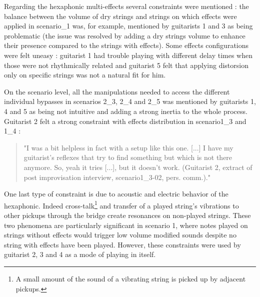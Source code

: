 \documentclass{article}
\begin{document}
Regarding the hexaphonic multi-effects several constraints were mentioned : the balance between the volume of dry strings and strings on which effects were applied in scenario\_1 was, for example, mentioned by guitarists 1 and 3 as being problematic (the issue was resolved by adding a dry strings volume to enhance their presence compared to the strings with effects). Some effects configurations were felt uneasy : guitarist 1 had trouble playing with different delay times when those were not rhythmically related and guitarist 5 felt that applying distorsion only on specific strings was not a natural fit for him. 

On the scenario level, all the manipulations needed to access the different individual bypasses in scenarios 2\_3, 2\_4 and 2\_5 was mentioned by guitarists 1, 4 and 5 as being not intuitive and adding a strong inertia to the whole process.
Guitarist 2 felt a strong constraint with effects distribution in scenario1\_3 and 1\_4 :
    \begin{quote}
        "I was a bit helpless in fact with a setup like this one. [...] I have my guitarist's reflexes that try to find something but which is not there anymore. So, yeah it tries [...], but it doesn't work. (Guitarist 2, extract of post improvisation interview, scenario1\_3-02, pers. comm.)."
    \end{quote}

One last type of constraint is due to acoustic and electric behavior of the hexaphonic. Indeed cross-talk\footnote{A small amount of the sound of a vibrating string is picked up by adjacent pickups.} and transfer of a played string's vibrations to other pickups through the bridge create resonances on non-played strings. These two phenomena are particularly significant in scenario 1, where notes played on strings without effects would trigger low volume modified sounds despite no string with effects have been played.
However, these constraints were used by guitarist 2, 3 and 4 as a mode of playing in itself. 
\end{document}
